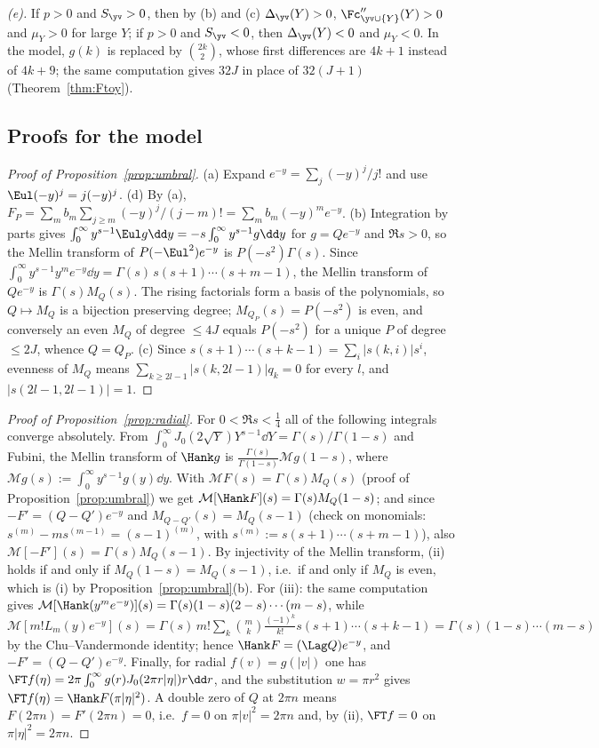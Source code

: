 \emph{(e).} If $p>0$ and $S_{\yv}>0$, then by (b) and (c) $\Delta_{\yv}(Y)>0$, $\Fc''_{\yv\cup\{Y\}}(Y)>0$ and $\mu_Y>0$ for large
$Y$; if $p>0$ and $S_{\yv}<0$, then $\Delta_{\yv}(Y)<0$ and $\mu_Y<0$. In the model, $g(k)$ is replaced by $\binom{2k}{2}$, whose
first differences are $4k+1$ instead of $4k+9$; the same computation gives $32J$ in place of $32(J+1)$
(Theorem~\ref{thm:Ftoy}).

\subsection{Proofs for the model}\label{app:proofs-toy}

\begin{proof}[Proof of Proposition~\textup{\ref{prop:umbral}}]
(a) Expand $e^{-y}=\sum_j(-y)^j/j!$ and use $\Eul(-y)^j=j(-y)^j$. (d) By (a),
$F_P=\sum_mb_m\sum_{j\ge m}(-y)^j/(j-m)!=\sum_mb_m(-y)^me^{-y}$. (b) Integration by parts gives
$\int_0^\infty y^{s-1}\Eul g\dd y=-s\int_0^\infty y^{s-1}g\dd y$ for $g=Qe^{-y}$ and $\Re s>0$, so the Mellin
transform of $P(-\Eul^2)e^{-y}$ is $P(-s^2)\Gamma(s)$. Since $\int_0^\infty y^{s-1}y^me^{-y}\dd y=\Gamma(s)\,s(s+1)\cdots(s+m-1)$,
the Mellin transform of $Qe^{-y}$ is $\Gamma(s)M_Q(s)$. The rising factorials form a basis of the polynomials, so
$Q\mapsto M_Q$ is a bijection preserving degree; $M_{Q_P}(s)=P(-s^2)$ is even, and conversely an even $M_Q$ of degree
$\le4J$ equals $P(-s^2)$ for a unique $P$ of degree $\le 2J$, whence $Q=Q_P$. (c) Since
$s(s+1)\cdots(s+k-1)=\sum_i|s(k,i)|s^i$, evenness of $M_Q$ means
$\sum_{k\ge 2l-1}|s(k,2l-1)|q_k=0$ for every $l$, and $|s(2l-1,2l-1)|=1$.
\end{proof}

\begin{proof}[Proof of Proposition~\textup{\ref{prop:radial}}]
For $0<\Re s<\frac14$ all of the following integrals converge absolutely. From
$\int_0^\infty J_0(2\sqrt Y)Y^{s-1}\dd Y=\Gamma(s)/\Gamma(1-s)$ and Fubini, the Mellin transform of $\Hank g$ is
$\frac{\Gamma(s)}{\Gamma(1-s)}\mathcal Mg(1-s)$, where $\mathcal Mg(s):=\int_0^\infty y^{s-1}g(y)\dd y$. With
$\mathcal MF(s)=\Gamma(s)M_Q(s)$ (proof of Proposition~\ref{prop:umbral}) we get
$\mathcal M[\Hank F](s)=\Gamma(s)M_Q(1-s)$; and since $-F'=(Q-Q')e^{-y}$ and $M_{Q-Q'}(s)=M_Q(s-1)$ (check on
monomials: $s^{(m)}-ms^{(m-1)}=(s-1)^{(m)}$, with $s^{(m)}:=s(s+1)\cdots(s+m-1)$), also
$\mathcal M[-F'](s)=\Gamma(s)M_Q(s-1)$. By
injectivity of the Mellin transform, (ii) holds if and only if $M_Q(1-s)=M_Q(s-1)$, i.e.\ if and only if $M_Q$ is
even, which is (i) by Proposition~\ref{prop:umbral}(b). For (iii): the same computation gives
$\mathcal M[\Hank(y^me^{-y})](s)=\Gamma(s)(1-s)(2-s)\cdots(m-s)$, while
$\mathcal M[m!L_m(y)e^{-y}](s)=\Gamma(s)\,m!\sum_k\binom mk\frac{(-1)^k}{k!}s(s+1)\cdots(s+k-1)=\Gamma(s)(1-s)\cdots(m-s)$
by the Chu--Vandermonde identity; hence $\Hank F=(\Lag Q)e^{-y}$, and $-F'=(Q-Q')e^{-y}$. Finally, for radial
$f(v)=g(|v|)$ one has $\FT f(\eta)=2\pi\int_0^\infty g(r)J_0(2\pi r|\eta|)r\dd r$, and the substitution $w=\pi r^2$
gives $\FT f(\eta)=\Hank F(\pi|\eta|^2)$. A double zero of $Q$ at $2\pi n$ means $F(2\pi n)=F'(2\pi n)=0$, i.e.\
$f=0$ on $\pi|v|^2=2\pi n$ and, by (ii), $\FT f=0$ on $\pi|\eta|^2=2\pi n$.
\end{proof}

